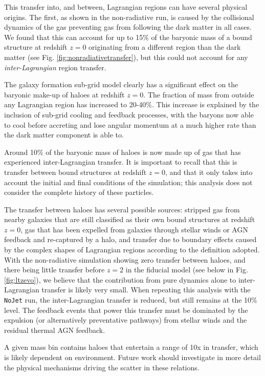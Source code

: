 \documentclass[fleqn,usenatbib]{mnras}
\newcommand{\nojet}{{\tt NoJet}}
\begin{document}
This transfer into, and between, Lagrangian regions can have several physical
origins. The first, as shown in the non-radiative run, is caused by the
collisional dynamics of the gas preventing gas from following the dark matter
in all cases. We found that this can account for up to 15\% of the baryonic
mass of a bound structure at redshift $z=0$ originating from a different
region than the dark matter (see Fig. \ref{fig:nonradiativetransfer}), but this
could not account for any \emph{inter-Lagrangian} region transfer.

The galaxy formation sub-grid model clearly has a significant effect on the
baryonic make-up of haloes at redshift $z=0$. The fraction of mass from
outside any Lagrangian region has increased to 20-40\%. This increase is
explained by the inclusion of sub-grid cooling and feedback processes, with
the baryons now able to cool before accreting and lose angular momentum at a
much higher rate than the dark matter component is able to.

Around 10\% of the baryonic mass of haloes is now made up of gas that has
experienced inter-Lagrangian transfer. It is important to recall that this is transfer
between bound structures at redshift $z=0$, and that it only takes into account
the initial and final conditions of the simulation; this analysis does not
consider the complete history of these particles.

The transfer between haloes has several possible sources: stripped gas from
nearby galaxies that are still classified as their own bound structures at
redshift $z=0$, gas that has been expelled from galaxies through stellar
winds or AGN feedback and re-captured by a halo, and transfer due to boundary
effects caused by the complex shapes of Lagrangian regions according to the
definition adopted. With the non-radiative simulation showing zero transfer
between haloes, and there being little transfer before $z=2$ in the fiducial
model (see below in Fig. \ref{fig:ltzevo}), we believe that the contribution
from pure dynamics alone to inter-Lagrangian transfer is likely very small.
When repeating this analysis with the \nojet{} run, the inter-Lagrangian
transfer is reduced, but still remains at the 10\% level. The feedback events
that power this transfer must be dominated by the expulsion (or alternatively
preventative pathways) from stellar winds and the residual thermal AGN
feedback.

A given mass bin contains haloes that entertain a range of 10x in transfer,
which is likely dependent on environment. Future work should investigate in more detail
the physical mechanisms driving the scatter in these relations.
\end{document}
